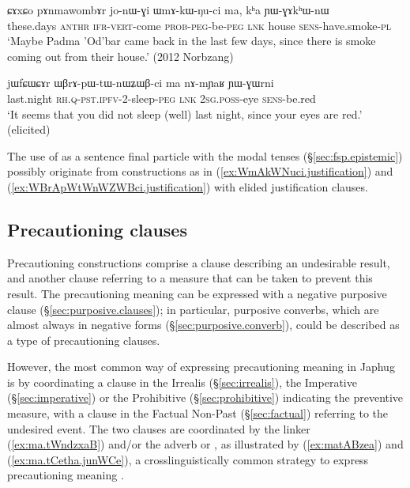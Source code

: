 \begin{exe}
\ex \label{ex:WmAkWNuci.justification}
 \gll ɕɤxɕo pɤnmawombɤr jo-nɯ-ɣi ɯmɤ-kɯ-ŋu-ci ma, kʰa ɲɯ-ɣɤkʰɯ-nɯ \\
these.days  \textsc{anthr} \textsc{ifr}-\textsc{vert}-come \textsc{prob}-\textsc{peg}-be-\textsc{peg} \textsc{lnk} house \textsc{sens}-have.smoke-\textsc{pl} \\
\glt `Maybe Padma 'Od'bar came back in the last few days, since there is smoke coming out from their house.' (2012 Norbzang)
\end{exe} 

 \begin{exe}
\ex \label{ex:WBrApWtWnWZWBci.justification}
 \gll  jɯfɕɯɕɤr ɯβrɤ-pɯ-tɯ-nɯʑɯβ-ci ma nɤ-mɲaʁ ɲɯ-ɣɯrni \\
 last.night \textsc{rh}.\textsc{q}-\textsc{pst}.\textsc{ipfv}-2-sleep-\textsc{peg} \textsc{lnk} \textsc{2sg}.\textsc{poss}-eye \textsc{sens}-be.red \\
 \glt `It seems that you did not sleep (well) last night, since your eyes are red.' (elicited)
\end{exe} 

 The use of  as a sentence final particle with the modal tenses (§\ref{sec:fsp.epistemic}) possibly originate from constructions as in (\ref{ex:WmAkWNuci.justification}) and (\ref{ex:WBrApWtWnWZWBci.justification}) with elided justification clauses.
 
\subsection{Precautioning clauses} \label{sec:precautioning.clauses} 
Precautioning constructions comprise a clause describing an undesirable result, and another clause referring to a measure that can be taken to prevent this result. The precautioning meaning can be expressed with a negative purposive clause (§\ref{sec:purposive.clauses}); in particular, purposive converbs, which are almost always in negative forms (§\ref{sec:purposive.converb}), could be described as a type of precautioning clauses.

However, the most common way of expressing precautioning meaning in Japhug is by coordinating a clause in the Irrealis (§\ref{sec:irrealis}), the Imperative (§\ref{sec:imperative}) or the Prohibitive (§\ref{sec:prohibitive}) indicating the preventive measure, with a clause in the Factual Non-Past (§\ref{sec:factual}) referring to the undesired event. The two clauses are coordinated by the linker  (\ref{ex:ma.tWndzxaB}) and/or the adverb  or , as illustrated by (\ref{ex:matABzea}) and (\ref{ex:ma.tCetha.junWCe}), a crosslinguistically common strategy to express precautioning meaning \citep{angelo16beware}.


